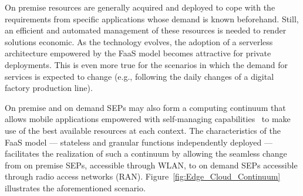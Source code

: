 On premise resources are generally acquired and deployed to cope with the requirements from specific applications whose demand is known beforehand. Still, an efficient and automated management of these resources is needed to render solutions economic. As the technology evolves, the adoption of a serverless architecture empowered by the FaaS model becomes attractive for private deployments. This is even more true for the scenarios in which the demand for services is expected to change (e.g., following the daily changes of a digital factory production line). 

On premise and on demand SEPs may also form a computing continuum that allows mobile applications empowered with self-managing capabilities~\cite{OrsiniBL16,Baresi:2018} to make use of the best available resources at each context. The characteristics of the FaaS model --- stateless and granular functions independently deployed --- facilitates the realization of such a continuum by allowing the seamless change from on premise SEPs, accessible through WLAN, to on demand SEPs accessible through radio access networks (RAN). Figure~\ref{fig:Edge_Cloud_Continuum} illustrates the aforementioned scenario. 













